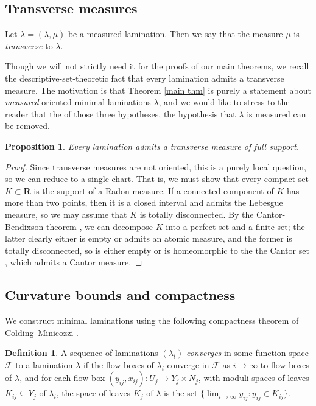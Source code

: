 \documentclass[reqno,10pt]{amsart}
\newcommand{\RR}{\mathbf{R}}
\newcommand{\dfn}[1]{\emph{#1}\index{#1}}
\newtheorem{proposition}[theorem]{Proposition}
\theoremstyle{definition}
\newtheorem{definition}[theorem]{Definition}
\numberwithin{equation}{section}
\begin{document}
\subsection{Transverse measures}
Let $\lambda = (\lambda, \mu)$ be a measured lamination.
Then we say that the measure $\mu$ is \dfn{transverse} to $\lambda$.

Though we will not strictly need it for the proofs of our main theorems, we recall the descriptive-set-theoretic fact that every lamination admits a transverse measure.
The motivation is that Theorem \ref{main thm} is purely a statement about \emph{measured} oriented minimal laminations $\lambda$, and we would like to stress to the reader that the of those three hypotheses, the hypothesis that $\lambda$ is measured can be removed.

\begin{proposition}
Every lamination admits a transverse measure of full support.
\end{proposition}
\begin{proof}
Since transverse measures are not oriented, this is a purely local question, so we can reduce to a single chart.
That is, we must show that every compact set $K \subset \RR$ is the support of a Radon measure.
If a connected component of $K$ has more than two points, then it is a closed interval and admits the Lebesgue measure, so we may assume that $K$ is totally disconnected.
By the Cantor-Bendixson theorem \cite[Theorem 6.4]{kechris2012classical}, we can decompose $K$ into a perfect set and a finite set; the latter clearly either is empty or admits an atomic measure, and the former is totally disconnected, so is either empty or is homeomorphic to the the Cantor set \cite[Chapter 2]{Pugh02}, which admits a Cantor measure.
\end{proof}




\subsection{Curvature bounds and compactness}
We construct minimal laminations using the following compactness theorem of Colding--Minicozzi \cite[Proposition B.1]{ColdingMinicozziIV} \cite[{\S}II.1]{ColdingMinicozziV}.

\begin{definition}
A sequence of laminations $(\lambda_i)$ \dfn{converges} in some function space $\mathscr F$ to a lamination $\lambda$ if the flow boxes of $\lambda_i$ converge in $\mathscr F$ as $i \to \infty$ to flow boxes of $\lambda$, and for each flow box $(y_{ij}, x_{ij}): U_j \to Y_j \times N_j$, with moduli spaces of leaves $K_{ij} \subseteq Y_j$ of $\lambda_i$, the space of leaves $K_j$ of $\lambda$ is the set $\{\lim_{i \to \infty} y_{ij}: y_{ij} \in K_{ij}\}$.
\end{definition}
\end{document}
